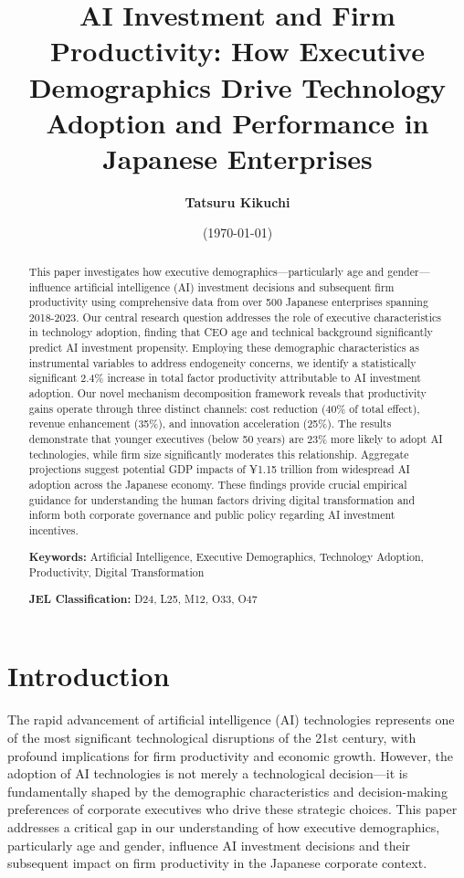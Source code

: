 \documentclass[12pt, a4paper]{article}
\title{\large{\bf{
AI Investment and Firm Productivity: How Executive Demographics Drive Technology Adoption and Performance in Japanese Enterprises
}}}
\author{\large{\bf{Tatsuru Kikuchi}}}
\affil{\small{\it{Faculty of Economics, The University of Tokyo,}}\\
{\it{7-3-1 Hongo, Bunkyo-ku, Tokyo 113-0033 Japan}}}
\date{\small{(\today)}}
\begin{document}
\maketitle
\begin{abstract}
This paper investigates how executive demographics—particularly age and gender—influence artificial intelligence (AI) investment decisions and subsequent firm productivity using comprehensive data from over 500 Japanese enterprises spanning 2018-2023. Our central research question addresses the role of executive characteristics in technology adoption, finding that CEO age and technical background significantly predict AI investment propensity. Employing these demographic characteristics as instrumental variables to address endogeneity concerns, we identify a statistically significant 2.4\% increase in total factor productivity attributable to AI investment adoption. Our novel mechanism decomposition framework reveals that productivity gains operate through three distinct channels: cost reduction (40\% of total effect), revenue enhancement (35\%), and innovation acceleration (25\%). The results demonstrate that younger executives (below 50 years) are 23\% more likely to adopt AI technologies, while firm size significantly moderates this relationship. Aggregate projections suggest potential GDP impacts of ¥1.15 trillion from widespread AI adoption across the Japanese economy. These findings provide crucial empirical guidance for understanding the human factors driving digital transformation and inform both corporate governance and public policy regarding AI investment incentives.

\textbf{Keywords:} Artificial Intelligence, Executive Demographics, Technology Adoption, Productivity, Digital Transformation

\textbf{JEL Classification:} D24, L25, M12, O33, O47
\end{abstract}

\newpage

\section{Introduction}

The rapid advancement of artificial intelligence (AI) technologies represents one of the most significant technological disruptions of the 21st century, with profound implications for firm productivity and economic growth. However, the adoption of AI technologies is not merely a technological decision—it is fundamentally shaped by the demographic characteristics and decision-making preferences of corporate executives who drive these strategic choices. This paper addresses a critical gap in our understanding of how executive demographics, particularly age and gender, influence AI investment decisions and their subsequent impact on firm productivity in the Japanese corporate context.
\end{document}
